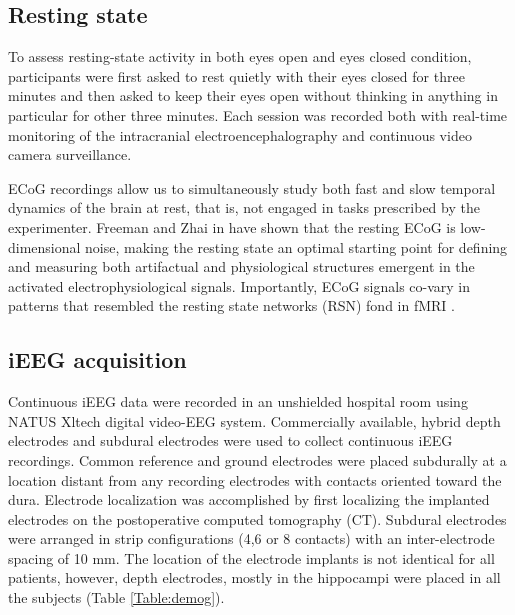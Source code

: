 \documentclass[11pt, onecolumn]{article}
\begin{document}
\subsection{Resting state}
To assess resting-state activity in both eyes open and eyes closed condition, participants were first asked to rest quietly with their eyes closed for three minutes and then asked to keep their eyes open without thinking in anything in particular for other three minutes. Each session was recorded both with real-time monitoring of the intracranial electroencephalography and continuous video camera surveillance.

ECoG recordings allow us to simultaneously study both fast and slow temporal dynamics of the brain at rest, that is, not engaged in tasks prescribed by the experimenter.
Freeman and Zhai in \citep{freeman2009simulated} have shown that the resting ECoG is low-dimensional noise, making the resting state an optimal starting point for defining and measuring both artifactual and physiological structures emergent in the activated electrophysiological signals. Importantly, ECoG signals co-vary in patterns that resembled the resting state networks (RSN) fond in fMRI  \citep{fukushima2015studying}.

\subsection{iEEG acquisition}
Continuous iEEG data were recorded in an unshielded hospital room using NATUS Xltech digital video-EEG system.
Commercially available, hybrid depth electrodes and subdural electrodes were used to collect continuous iEEG recordings. Common reference and ground electrodes were placed subdurally at a location distant from any recording electrodes with contacts oriented toward the dura.
Electrode localization was accomplished by first localizing the implanted electrodes on the postoperative computed tomography (CT).
Subdural electrodes were arranged in strip configurations (4,6 or 8 contacts) with an inter-electrode spacing of 10 mm. The location of the electrode implants is not identical for all patients, however, depth electrodes, mostly in the hippocampi were placed in all the subjects (Table \ref{Table:demog}).
\end{document}
